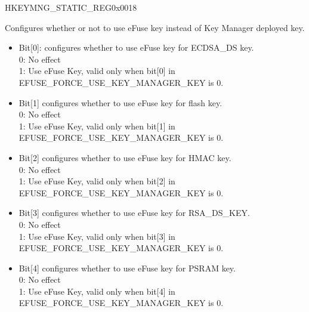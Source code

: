 \begin{register}{H}{KEYMNG\_STATIC\_REG}{0x0018}\label{regdesc:KEYMNGSTATICREG}
%
%
%
%
%
%
\regnewline%
\begin{regdesc}\begin{reglist}
\label{fielddesc:KEYMNGUSEEFUSEKEY}\item [KEYMNG\_USE\_EFUSE\_KEY] Configures whether or not to use eFuse key instead of Key Manager deployed key.\\
\begin{itemize}
    \item Bit[0]: configures whether to use eFuse key for ECDSA\_DS key.\\
        0: No effect\\
        1: Use eFuse Key, valid only when bit[0] in EFUSE\_FORCE\_USE\_KEY\_MANAGER\_KEY is 0.\\
    \item Bit[1] configures whether to use eFuse key for flash key.\\
        0: No effect\\
        1: Use eFuse Key, valid only when bit[1] in EFUSE\_FORCE\_USE\_KEY\_MANAGER\_KEY is 0.\\
    \item Bit[2] configures whether to use eFuse key for HMAC key. \\
        0: No effect\\
        1: Use eFuse Key, valid only when bit[2] in EFUSE\_FORCE\_USE\_KEY\_MANAGER\_KEY is 0.\\
    \item Bit[3] configures whether to use eFuse key for RSA\_DS\_KEY. \\
        0: No effect\\
        1: Use eFuse Key, valid only when bit[3] in EFUSE\_FORCE\_USE\_KEY\_MANAGER\_KEY is 0.\\
    \item Bit[4] configures whether to use eFuse key for PSRAM key. \\
        0: No effect\\
        1: Use eFuse Key, valid only when bit[4] in EFUSE\_FORCE\_USE\_KEY\_MANAGER\_KEY is 0.\\

\end{itemize}
\end{reglist}
\end{regdesc}
\end{register}
